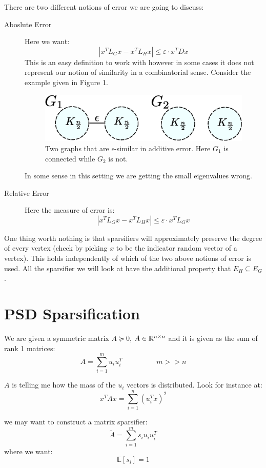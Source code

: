 \documentclass[11pt]{article}
\begin{document}
There are two different notions of error we are going to discuss:
\begin{description}
\item[Aboslute Error] Here we want:
\[|x^TL_Gx - x^TL_Hx| \leq \varepsilon \cdot x^TDx\]
This is an easy definition to work with however in some cases it does not represent our notion of similarity in a combinatorial sense. Consider the example given in Figure 1.
\begin{figure}[h]
    \centering
    \includegraphics[scale=0.85]{additive-approximation-graphs.eps}
    \caption{Two graphs that are $\epsilon$-similar in additive error. Here $G_1$ is connected while $G_2$ is not.}
    \label{fig:my_label}
\end{figure}
In some sense  in this setting we are getting the small eigenvalues wrong.
\item[Relative Error]Here the measure of error is:
\[
    |x^TL_Gx - x^TL_Hx| \leq \varepsilon \cdot x^TL_Gx
\]
\end{description}

One thing worth nothing is that sparsifiers will approximately preserve the degree of every vertex (check by picking $x$ to be the indicator random vector of a vertex).
This holds independently of which of the two above notions of error is used. All the sparsifier we will look at have the additional property that $E_H \subseteq E_G$.

\section*{PSD Sparsification}
We are given a symmetric matrix $A \succeq 0$, $A \in \mathbb{R}^{n \times n}$ and it is given as the sum of rank 1 matrices:
\[
    A = \sum_{i=1}^m u_iu_i^T \hspace{2cm} m >>n
\]

$A$ is telling me how the mass of the $u_i$ vectors is distributed. Look for instance at:
\[
    x^TAx = \sum_{i=1}^n (u_i^Tx)^2
\]

we may want to construct a matrix sparsifier:
\[
    \tilde{A} = \sum_{i=1}^m s_i u_iu_i^T
\]
where we want:
\[
    \mathbb{E}[s_i]=1
\]
\end{document}
